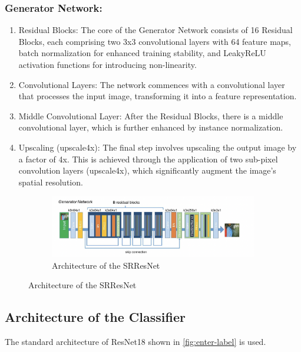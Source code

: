 \documentclass[10pt,twocolumn,letterpaper]{article}
\begin{document}
\subsubsection{Generator Network:}
\begin{enumerate}
    \item Residual Blocks: The core of the Generator Network consists of 16 Residual Blocks, each comprising two 3x3 convolutional layers with 64 feature maps, batch normalization for enhanced training stability, and LeakyReLU activation functions for introducing non-linearity.

    \item Convolutional Layers: The network commences with a convolutional layer that processes the input image, transforming it into a feature representation.

    \item Middle Convolutional Layer: After the Residual Blocks, there is a middle convolutional layer, which is further enhanced by instance normalization.

    \item Upscaling (upscale4x): The final step involves upscaling the output image by a factor of 4x. This is achieved through the application of two sub-pixel convolution layers (upscale4x), which significantly augment the image's spatial resolution.
\end{enumerate}
\begin{figure}
    \centering
    \begin{subfigure}{0.5\textwidth}
        \centering
        \includegraphics[width=\linewidth]{SRResNet.png}
        \caption{Architecture of the SRResNet}
    \end{subfigure}
\end{figure}

\subsection{Architecture of the Classifier}
The standard architecture of ResNet18 shown in \ref{fig:enter-label} is used.
\end{document}
